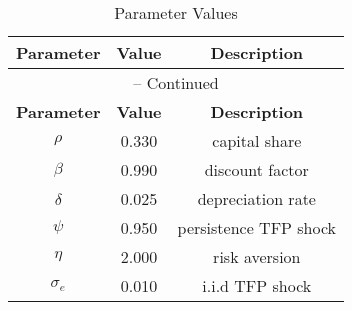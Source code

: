 \begin{center}
\begin{longtable}{ccc}
\caption{Parameter Values}\\%
\toprule%
\multicolumn{1}{c}{\textbf{Parameter}} &
\multicolumn{1}{c}{\textbf{Value}} &
 \multicolumn{1}{c}{\textbf{Description}}\\%
\midrule%
\endfirsthead
\multicolumn{3}{c}{{\tablename} \thetable{} -- Continued}\\%
\midrule%
\multicolumn{1}{c}{\textbf{Parameter}} &
\multicolumn{1}{c}{\textbf{Value}} &
  \multicolumn{1}{c}{\textbf{Description}}\\%
\midrule%
\endhead
${\rho}$ 	 & 	 0.330 	 & 	 capital share\\
${\beta}$ 	 & 	 0.990 	 & 	 discount factor\\
${\delta}$ 	 & 	 0.025 	 & 	 depreciation rate\\
${\psi}$ 	 & 	 0.950 	 & 	 persistence TFP shock\\
${\eta}$ 	 & 	 2.000 	 & 	 risk aversion\\
${\sigma_{e}}$ 	 & 	 0.010 	 & 	 i.i.d TFP shock\\
\bottomrule%
\end{longtable}
\end{center}
